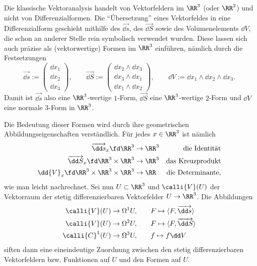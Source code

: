 \begin{antwort}
  Die klassische Vektoranalysis handelt von Vektorfeldern 
  im $\RR^3$ (oder $\RR^2$) und nicht von Differenzialformen. 
  Die "`Übersetzung"' eines Vektorfeldes in eine Differenzialform 
  geschieht mithilfe des  
  $\overrightarrow{ \dd {s} }$, des  
  $\overrightarrow{ \dd {S} }$ sowie des Volumenelements $\dd V$, 
  die schon an anderer Stelle rein symbolisch verwendet wurden. 
  Diese lassen sich auch präzise als (vektorwertige) Formen im 
  $\RR^3$ einführen, nämlich durch die Festsetzungen
  \[
  \overrightarrow{\dd s} := \begin{pmatrix} 
    \dd x_1 \\ \dd x_2 \\ \dd x_3 \end{pmatrix},
  \qquad 
  \overrightarrow{ \dd {S} } := \begin{pmatrix} 
    \dd x_2 \wedge \dd x_3 \\
    \dd x_3 \wedge \dd x_1 \\
    \dd x_1 \wedge \dd x_2
  \end{pmatrix}, \qquad
  \dd V := \dd x_1 \wedge \dd x_2 \wedge \dd x_3.
  \]
  Damit ist $\overrightarrow{ \dd s }$ also eine $\RR^3$-wertige 
  $1$-Form, $\overrightarrow{ \dd S }$ eine $\RR^3$-wertige $2$-Form 
  und $\dd V$ eine normale $3$-Form in $\RR^3$.

  Die Bedeutung dieser Formen wird durch ihre geometrischen 
  Abbildungseigenschaften verständlich. Für jedes $x\in\RR^3$ ist nämlich 
  \begin{align*}
    \overrightarrow{ \dd s }_x \fd \RR^3 &\to \RR^3 & \text{die Identität}\\
    \overrightarrow{ \dd S }_x \fd \RR^3 \times \RR^3 &\to \RR^3 & 
    \text{das Kreuzprodukt}\\
    \dd {V}_x \fd \RR^3 \times \RR^3 \times \RR^3 &\to 
    \RR & \text{die Determinante},
  \end{align*}
  wie man leicht nachrechnet. Sei nun 
  $U\subset \RR^3$ und $\calli{V}(U)$ der Vektorraum der 
  stetig differenzierbaren Vektorfelder $U \to\RR^3$. Die Abbildungen 
  \begin{align*}
    \calli{V}( U ) \to \Omega^1 U, &\qquad 
    F \mapsto  \langle F, \overrightarrow{ \dd s } \rangle \\
    \calli{V}( U ) \to \Omega^2 U, &\qquad F \mapsto 
    \langle  F, \overrightarrow{ \dd S } \rangle \\
    \calli{C}^1( U ) \to \Omega^3 U, &\qquad f 
    \mapsto f \dd V 
  \end{align*}
  siften dann eine eineindeutige Zuordnung zwischen 
  den stetig differenzierbaren Vektorfeldern bzw. Funktionen auf $U$ 
  und den Formen auf $U$. 


\end{antwort}
